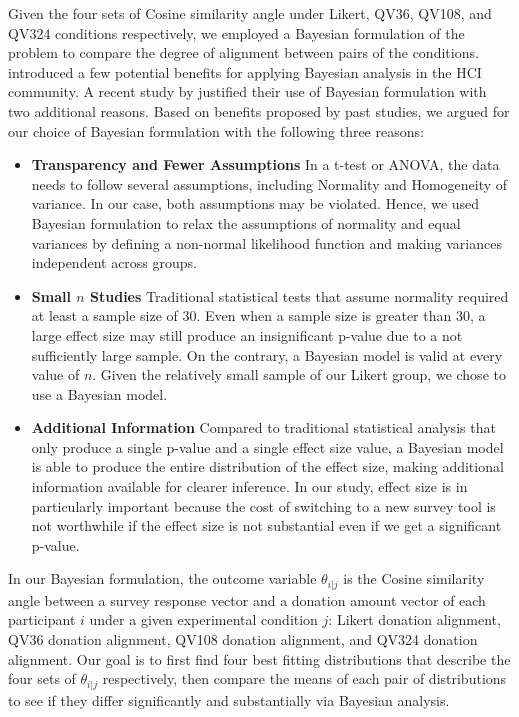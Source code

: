 Given the four sets of Cosine similarity angle 
under Likert, QV36, QV108, and QV324 conditions respectively, 
we employed a Bayesian formulation of the problem 
to compare the degree of alignment between pairs of the conditions. 
\textcite{kay2016researcher} introduced a few potential benefits 
for applying Bayesian analysis in the HCI community. 
A recent study by \textcite{xiao2019should} 
justified their use of Bayesian formulation 
with two additional reasons. 
Based on benefits proposed by past studies, 
we argued for our choice of Bayesian formulation 
with the following three reasons:

\begin{itemize}
    \item \textbf{Transparency and Fewer Assumptions} 
    In a t-test or ANOVA, 
    the data needs to follow several assumptions, 
    including Normality and Homogeneity of variance. 
    In our case, both assumptions may be violated. 
    Hence, we used Bayesian formulation 
    to relax the assumptions of normality and 
    equal variances by defining 
    a non-normal likelihood function 
    and making variances independent across groups.
    \item \textbf{Small $n$ Studies} 
    Traditional statistical tests 
    that assume normality 
    required at least a sample size of 30. 
    Even when a sample size is greater than 30, 
    a large effect size may still produce 
    an insignificant p-value 
    due to a not sufficiently large sample. 
    On the contrary, 
    a Bayesian model is valid at every value of $n$. 
    Given the relatively small sample 
    of our Likert group, 
    we chose to use a Bayesian model.
    \item \textbf{Additional Information} 
    Compared to traditional statistical analysis 
    that only produce a single p-value 
    and a single effect size value, 
    a Bayesian model is able to produce 
    the entire distribution of the effect size, 
    making additional information available 
    for clearer inference. 
    In our study, 
    effect size is in particularly important 
    because the cost of switching to a new survey tool 
    is not worthwhile 
    if the effect size is not substantial 
    even if we get a significant p-value.
\end{itemize}

In our Bayesian formulation, 
the outcome variable $\theta_{i|j}$ 
is the Cosine similarity angle 
between a survey response vector and 
a donation amount vector of each participant $i$ 
under a given experimental condition $j$: 
Likert donation alignment, QV36 donation alignment, 
QV108 donation alignment, and QV324 donation alignment. 
Our goal is to first find four best fitting distributions
that describe the four sets of $\theta_{i|j}$ respectively, 
then compare the means of each pair of distributions 
to see if they differ significantly 
and substantially via Bayesian analysis.

